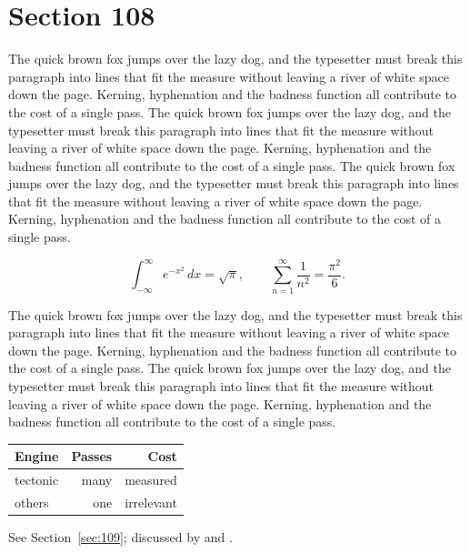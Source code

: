 \documentclass{article}
\begin{document}
\section{Section 108}
\label{sec:108}
The quick brown fox jumps over the lazy dog, and the typesetter must break this paragraph into lines that fit the measure without leaving a river of white space down the page. Kerning, hyphenation and the badness function all contribute to the cost of a single pass. The quick brown fox jumps over the lazy dog, and the typesetter must break this paragraph into lines that fit the measure without leaving a river of white space down the page. Kerning, hyphenation and the badness function all contribute to the cost of a single pass. The quick brown fox jumps over the lazy dog, and the typesetter must break this paragraph into lines that fit the measure without leaving a river of white space down the page. Kerning, hyphenation and the badness function all contribute to the cost of a single pass. 

\begin{equation}\label{eq:108}
\int_{-\infty}^{\infty} e^{-x^{2}}\,dx = \sqrt{\pi}, \qquad
\sum_{n=1}^{\infty} \frac{1}{n^{2}} = \frac{\pi^{2}}{6}.
\end{equation}

The quick brown fox jumps over the lazy dog, and the typesetter must break this paragraph into lines that fit the measure without leaving a river of white space down the page. Kerning, hyphenation and the badness function all contribute to the cost of a single pass. The quick brown fox jumps over the lazy dog, and the typesetter must break this paragraph into lines that fit the measure without leaving a river of white space down the page. Kerning, hyphenation and the badness function all contribute to the cost of a single pass. 

\begin{center}
\begin{tabular}{lrr}
\toprule
Engine & Passes & Cost \\
\midrule
tectonic & many & measured \\
others & one & irrelevant \\
\bottomrule
\end{tabular}
\end{center}

See Section~\ref{sec:109}; discussed by \textcite{k4} and \textcite{l1}.
\end{document}
